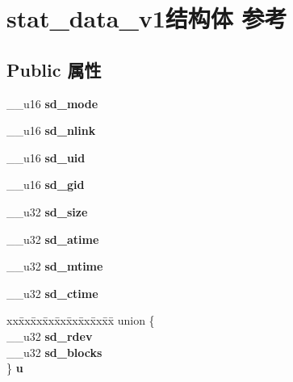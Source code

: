 \hypertarget{structstat__data__v1}{}\section{stat\+\_\+data\+\_\+v1结构体 参考}
\label{structstat__data__v1}
\subsection*{Public 属性}
\begin{DoxyCompactItemize}
\item 
\mbox{\label{structstat__data__v1_a12f414989c0db5c52703133a1a99537c}} 
\+\_\+\+\_\+u16 {\bfseries sd\+\_\+mode}
\item 
\mbox{\label{structstat__data__v1_ad061d43aa4483745277255cae44ff0c4}} 
\+\_\+\+\_\+u16 {\bfseries sd\+\_\+nlink}
\item 
\mbox{\label{structstat__data__v1_ab8f2644c3ffc4008d3c9e7c1b5694712}} 
\+\_\+\+\_\+u16 {\bfseries sd\+\_\+uid}
\item 
\mbox{\label{structstat__data__v1_a40d93c475bc792a53c0ee02be626105a}} 
\+\_\+\+\_\+u16 {\bfseries sd\+\_\+gid}
\item 
\mbox{\label{structstat__data__v1_a8b360e884fc0f25e5d553a227a3ea437}} 
\+\_\+\+\_\+u32 {\bfseries sd\+\_\+size}
\item 
\mbox{\label{structstat__data__v1_a01bc22852c6fcec754f8d73a8096c0f8}} 
\+\_\+\+\_\+u32 {\bfseries sd\+\_\+atime}
\item 
\mbox{\label{structstat__data__v1_aaba353584f9f8f583fc413f2370c1f4e}} 
\+\_\+\+\_\+u32 {\bfseries sd\+\_\+mtime}
\item 
\mbox{\label{structstat__data__v1_abe25ee83097f33a09139da04a5dfccd5}} 
\+\_\+\+\_\+u32 {\bfseries sd\+\_\+ctime}
\item 
\mbox{\label{structstat__data__v1_a70134f62c416219b3e129ddd12ec79be}} 
\begin{tabbing}
xx\=xx\=xx\=xx\=xx\=xx\=xx\=xx\=xx\=\kill
union \{\\
\>\_\_u32 {\bfseries sd\_rdev}\\
\>\_\_u32 {\bfseries sd\_blocks}\\
\} {\bfseries u}\\


\end{tabbing}
\end{DoxyCompactItemize}
